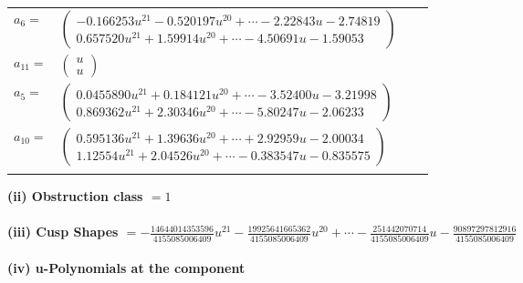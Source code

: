 \documentclass[1p]{elsarticle_modified}
\theoremstyle{definition}
\begin{document}
\begin{tabular}{m{7pt} m{180pt} m{7pt} m{180pt} }
\flushright $a_{6}=$&$\begin{pmatrix}-0.166253 u^{21}-0.520197 u^{20}+\cdots-2.22843 u-2.74819\\0.657520 u^{21}+1.59914 u^{20}+\cdots-4.50691 u-1.59053\end{pmatrix}$ \\
\flushright $a_{11}=$&$\begin{pmatrix}u\\u\end{pmatrix}$ \\
\flushright $a_{5}=$&$\begin{pmatrix}0.0455890 u^{21}+0.184121 u^{20}+\cdots-3.52400 u-3.21998\\0.869362 u^{21}+2.30346 u^{20}+\cdots-5.80247 u-2.06233\end{pmatrix}$ \\
\flushright $a_{10}=$&$\begin{pmatrix}0.595136 u^{21}+1.39636 u^{20}+\cdots+2.92959 u-2.00034\\1.12554 u^{21}+2.04526 u^{20}+\cdots-0.383547 u-0.835575\end{pmatrix}$\\&\end{tabular}
\flushleft \textbf{(ii) Obstruction class $= 1$}\\~\\
\flushleft \textbf{(iii) Cusp Shapes $= -\frac{14644014353596}{4155085006409} u^{21}-\frac{19925641665362}{4155085006409} u^{20}+\cdots-\frac{251442070714}{4155085006409} u-\frac{90897297812916}{4155085006409}$}\\~\\
\newpage\renewcommand{\arraystretch}{1}
\flushleft \textbf{(iv) u-Polynomials at the component}\newline \\
\end{document}
